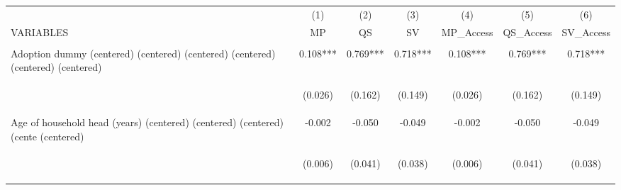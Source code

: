 \begin{center}
\begin{tabular}{lcccccc} \hline
 & (1) & (2) & (3) & (4) & (5) & (6) \\
VARIABLES & MP & QS & SV & MP\_Access & QS\_Access & SV\_Access \\ \hline
\vspace{4pt} & \begin{footnotesize}\end{footnotesize} & \begin{footnotesize}\end{footnotesize} & \begin{footnotesize}\end{footnotesize} & \begin{footnotesize}\end{footnotesize} & \begin{footnotesize}\end{footnotesize} & \begin{footnotesize}\end{footnotesize} \\
Adoption dummy (centered) (centered) (centered) (centered) (centered) (centered) & 0.108*** & 0.769*** & 0.718*** & 0.108*** & 0.769*** & 0.718*** \\
\vspace{4pt} & \begin{footnotesize}(0.026)\end{footnotesize} & \begin{footnotesize}(0.162)\end{footnotesize} & \begin{footnotesize}(0.149)\end{footnotesize} & \begin{footnotesize}(0.026)\end{footnotesize} & \begin{footnotesize}(0.162)\end{footnotesize} & \begin{footnotesize}(0.149)\end{footnotesize} \\
Age of household head (years) (centered) (centered) (centered) (cente (centered) & -0.002 & -0.050 & -0.049 & -0.002 & -0.050 & -0.049 \\
\vspace{4pt} & \begin{footnotesize}(0.006)\end{footnotesize} & \begin{footnotesize}(0.041)\end{footnotesize} & \begin{footnotesize}(0.038)\end{footnotesize} & \begin{footnotesize}(0.006)\end{footnotesize} & \begin{footnotesize}(0.041)\end{footnotesize} & \begin{footnotesize}(0.038)\end{footnotesize} \\

\end{tabular}
\end{center}
